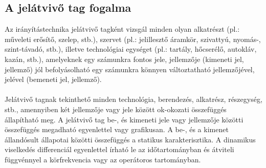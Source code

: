 \documentclass[11pt,a4paper]{article}
\begin{document}
\subsection{A jelátvivő tag fogalma}
Az irányítástechnika jelátvivő tagként vizsgál minden olyan alkatrészt (pl.: műveleti erősítő, szelep, stb.), szervet (pl.: jelillesztő áramkör, szivattyú, nyomás-, szint-távadó, stb.), illetve technológiai egységet (pl.: tartály, hőcserélő, autokláv, kazán, stb.), amelyeknek egy számunkra fontos jele, jellemzője (kimeneti jel, jellemző) jól befolyásolható egy számunkra könnyen változtatható jellemzőjével, jelével (bemeneti jel, jellemző). \\\\
Jelátvivő tagnak tekinthető minden technológia, berendezés, alkatrész, részegység, stb., amennyiben két jellemzője vagy jele között ok-okozati összefüggés állapítható meg. A jelátvivő tag be-, és kimeneti jele vagy jellemzője közötti összefüggés megadható egyenlettel vagy grafikusan. A be-, és a kimenet állandósult állapotai közötti összefüggés a statikus karakterisztika. A dinamikus viselkedés differenciál egyenlettel írható le az időtartományban  és átviteli függvénnyel a körfrekvencia vagy az operátoros tartományban.
\end{document}
